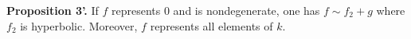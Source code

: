 \textbf{Proposition 3'.} If $f$ represents $0$ and is nondegenerate, one has $f \sim f_2 + g$ where $f_2$ is hyperbolic. Moreover, $f$ represents all elements of $k$.
